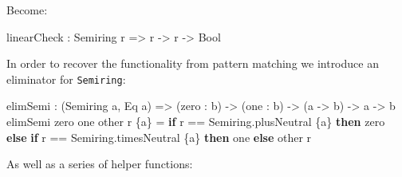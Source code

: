 \documentclass[
]{article}
\newenvironment{Shaded}{}{}
\newcommand{\DataTypeTok}[1]{\textcolor[rgb]{0.56,0.13,0.00}{#1}}
\newcommand{\KeywordTok}[1]{\textcolor[rgb]{0.00,0.44,0.13}{\textbf{#1}}}
\newcommand{\NormalTok}[1]{#1}
\newcommand{\OperatorTok}[1]{\textcolor[rgb]{0.40,0.40,0.40}{#1}}
\newcommand{\OtherTok}[1]{\textcolor[rgb]{0.00,0.44,0.13}{#1}}
\begin{document}
Become:

\begin{Shaded}
\begin{Highlighting}[]
\NormalTok{linearCheck }\OperatorTok{:} \DataTypeTok{Semiring}\NormalTok{ r }\OtherTok{=\textgreater{}}\NormalTok{ r }\OtherTok{{-}\textgreater{}}\NormalTok{ r }\OtherTok{{-}\textgreater{}} \DataTypeTok{Bool}
\end{Highlighting}
\end{Shaded}

In order to recover the functionality from pattern matching we introduce
an eliminator for \texttt{Semiring}:

\begin{Shaded}
\begin{Highlighting}[]
\NormalTok{elimSemi }\OperatorTok{:}\NormalTok{ (}\DataTypeTok{Semiring}\NormalTok{ a, }\DataTypeTok{Eq}\NormalTok{ a) }\OtherTok{=\textgreater{}}\NormalTok{ (zero }\OperatorTok{:}\NormalTok{ b) }\OtherTok{{-}\textgreater{}}\NormalTok{ (one }\OperatorTok{:}\NormalTok{ b) }\OtherTok{{-}\textgreater{}}\NormalTok{ (a }\OtherTok{{-}\textgreater{}}\NormalTok{ b) }
       \OtherTok{{-}\textgreater{}}\NormalTok{ a }\OtherTok{{-}\textgreater{}}\NormalTok{ b}
\NormalTok{elimSemi zero one other r \{a\} }\OtherTok{=}
  \KeywordTok{if}\NormalTok{ r }\OperatorTok{==}\NormalTok{ Semiring.plusNeutral \{a\}}
     \KeywordTok{then}\NormalTok{ zero}
     \KeywordTok{else} \KeywordTok{if}\NormalTok{ r }\OperatorTok{==}\NormalTok{ Semiring.timesNeutral \{a\}}
             \KeywordTok{then}\NormalTok{ one}
             \KeywordTok{else}\NormalTok{ other r}
\end{Highlighting}
\end{Shaded}

As well as a series of helper functions:
\end{document}
